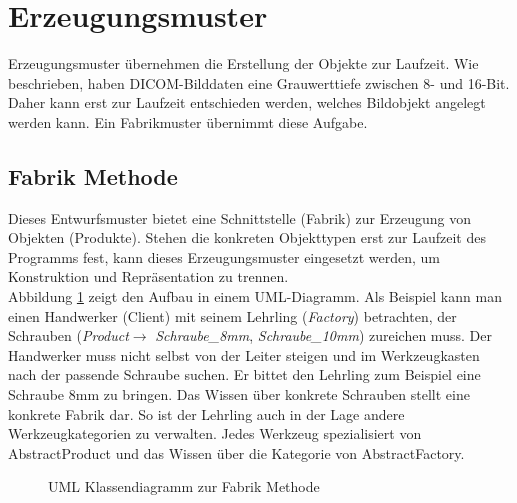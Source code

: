 \FloatBarrier
\section{Erzeugungsmuster} \label{creation}
Erzeugungsmuster übernehmen die Erstellung der Objekte zur Laufzeit. Wie beschrieben, haben DICOM-Bilddaten eine Grauwerttiefe zwischen 8- und 16-Bit. Daher kann erst zur Laufzeit entschieden werden, welches Bildobjekt angelegt werden kann. Ein Fabrikmuster übernimmt diese Aufgabe.


\FloatBarrier
\subsection{Fabrik Methode} \label{fabrikmethod}

Dieses Entwurfsmuster bietet eine Schnittstelle (Fabrik) zur Erzeugung von Objekten (Produkte). Stehen die konkreten Objekttypen erst zur Laufzeit des Programms fest, kann dieses Erzeugungsmuster eingesetzt werden, um Konstruktion und Repräsentation zu trennen\cite[3.3]{starke:swa}.\\
Abbildung \ref{factorymethod} zeigt den Aufbau in einem UML-Diagramm. Als Beispiel kann man einen Handwerker (Client) mit seinem Lehrling (\textit{Factory}) betrachten, der Schrauben (\textit{Product}$\rightarrow$ \textit{Schraube\_8mm}, \textit{Schraube\_10mm}) zureichen muss. Der Handwerker muss nicht selbst von der Leiter steigen und im Werkzeugkasten nach der passende Schraube suchen. Er bittet den Lehrling zum Beispiel eine Schraube 8mm zu bringen.
Das Wissen über konkrete Schrauben stellt eine konkrete Fabrik dar. So ist der Lehrling auch in der Lage andere Werkzeugkategorien zu verwalten. Jedes Werkzeug spezialisiert von AbstractProduct und das Wissen über die Kategorie von AbstractFactory.

\begin{figure}[htbp]
  \vspace{0.5cm}
  \centering
   \caption{UML Klassendiagramm zur Fabrik Methode \cite[S. 35]{starke:swa}}
  \label{factorymethod}
  \vspace{0.5cm}
\end{figure}

